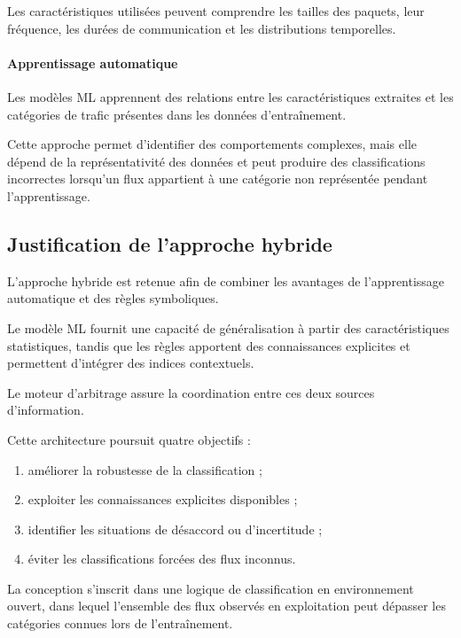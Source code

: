 Les caractéristiques utilisées peuvent comprendre
les tailles des paquets, leur fréquence, les durées
de communication et les distributions temporelles.

\paragraph{Apprentissage automatique}

Les modèles ML apprennent des relations entre les
caractéristiques extraites et les catégories de trafic
présentes dans les données d'entraînement.

Cette approche permet d'identifier des comportements
complexes, mais elle dépend de la représentativité
des données et peut produire des classifications
incorrectes lorsqu'un flux appartient à une catégorie
non représentée pendant l'apprentissage.

\subsection{Justification de l'approche hybride}

L'approche hybride est retenue afin de combiner
les avantages de l'apprentissage automatique et
des règles symboliques.

Le modèle ML fournit une capacité de généralisation
à partir des caractéristiques statistiques, tandis
que les règles apportent des connaissances explicites
et permettent d'intégrer des indices contextuels.

Le moteur d'arbitrage assure la coordination entre
ces deux sources d'information.

Cette architecture poursuit quatre objectifs :

\begin{enumerate}
    \item améliorer la robustesse de la classification ;
    \item exploiter les connaissances explicites disponibles ;
    \item identifier les situations de désaccord ou d'incertitude ;
    \item éviter les classifications forcées des flux inconnus.
\end{enumerate}

La conception s'inscrit dans une logique de classification
en environnement ouvert, dans lequel l'ensemble des flux
observés en exploitation peut dépasser les catégories
connues lors de l'entraînement.

